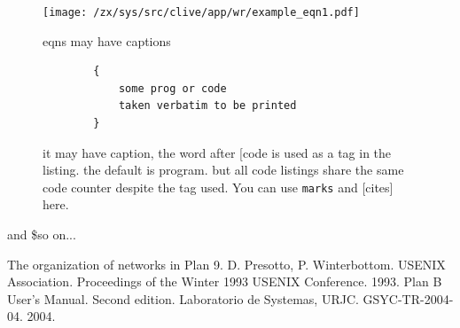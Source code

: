 \documentclass[a4paper]{article}
\begin{document}
\begin{figure}
\centering
    \texttt{[image: /zx/sys/src/clive/app/wr/example\_eqn1.pdf]}
\label{eqn1}
\caption{eqns may have captions }
\end{figure}

\begin{figure}
\centering
    \begin{verbatim}
        {
            some prog or code
            taken verbatim to be printed
        }

    \end{verbatim}
\label{lst1}
\caption{it may have caption, the word after [code is used as a tag
in the listing. the default is program. but all code listings share
the same code counter despite the tag used. You can use
\texttt{marks} and [cites] here. }
\end{figure}

and \$so on...
\begin{thebibliography}{50}
     The organization of networks in Plan 9. D. Presotto, P. Winterbottom.
    USENIX Association. Proceedings of the Winter 1993 USENIX Conference.
    1993.
     Plan B User's Manual. Second edition. Laboratorio de Systemas, URJC.
    GSYC-TR-2004-04. 2004.
\end{thebibliography}
\end{document}
